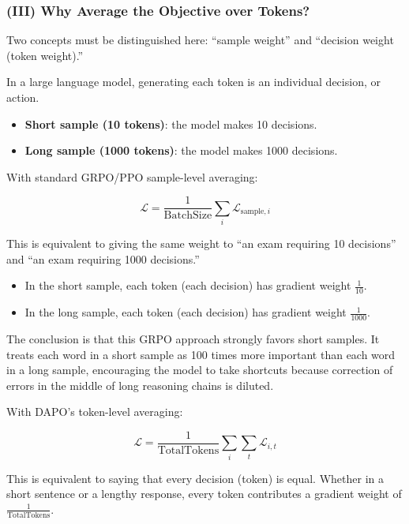\hypertarget{iii-why-average-the-objective-over-tokens}{%
\subsubsection{(III) Why Average the Objective over Tokens?}\label{iii-why-average-the-objective-over-tokens}}

Two concepts must be distinguished here: ``sample weight'' and ``decision weight (token weight).''

In a large language model, generating each token is an individual decision, or action.

\begin{itemize}
\tightlist
\item
  \textbf{Short sample (10 tokens)}: the model makes 10 decisions.
\item
  \textbf{Long sample (1000 tokens)}: the model makes 1000 decisions.
\end{itemize}

With standard GRPO/PPO sample-level averaging:

\[
\mathcal{L}
=
\frac{1}{\mathrm{BatchSize}}
\sum_i \mathcal{L}_{\mathrm{sample},i}
\]

This is equivalent to giving the same weight to ``an exam requiring 10 decisions'' and ``an exam requiring 1000 decisions.''

\begin{itemize}
\tightlist
\item
  In the short sample, each token (each decision) has gradient weight \(\frac{1}{10}\).
\item
  In the long sample, each token (each decision) has gradient weight \(\frac{1}{1000}\).
\end{itemize}

The conclusion is that this GRPO approach strongly favors short samples. It treats each word in a short sample as 100 times more important than each word in a long sample, encouraging the model to take shortcuts because correction of errors in the middle of long reasoning chains is diluted.

With DAPO's token-level averaging:

\[
\mathcal{L}
=
\frac{1}{\mathrm{TotalTokens}}
\sum_i \sum_t \mathcal{L}_{i,t}
\]

This is equivalent to saying that every decision (token) is equal. Whether in a short sentence or a lengthy response, every token contributes a gradient weight of \(\frac{1}{\mathrm{TotalTokens}}\).

